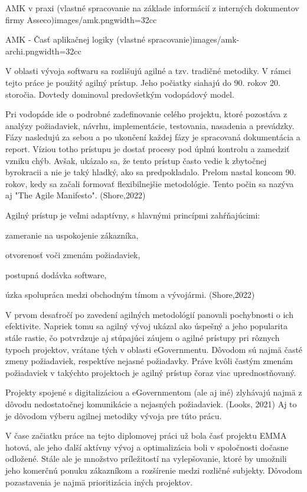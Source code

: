 {AMK v praxi (vlastné spracovanie na základe informácií z interných dokumentov firmy Asseco)}{images/amk.png}{width=32cc}

{AMK - Časť aplikačnej logiky (vlastné spracovanie)}{images/amk-archi.png}{width=32cc}

V oblasti vývoja softwaru sa rozlišujú agilné a tzv. tradičné metodiky. V rámci tejto práce je použitý agilný prístup. Jeho počiatky siahajú do 90. rokov 20. storočia. Dovtedy dominoval predovšetkým vodopádový model.

Pri vodopáde ide o podrobné zadefinovanie celého projektu, ktoré pozostáva z analýzy požiadaviek, návrhu, implementácie, testovania, nasadenia a prevádzky. Fázy nasledujú za sebou a po ukončení každej fázy je spracovaná dokumentácia a report. Víziou totho prístupu je dostať procesy pod úplnú kontrolu a zamedziť vzniku chýb. Avšak, ukázalo sa, že tento prístup často vedie k zbytočnej byrokracii a nie je taký hladký, ako sa predpokladalo. Prelom nastal koncom 90. rokov, kedy sa začali formovať flexibilnejšie metodológie. Tento počin sa nazýva aj "The Agile Manifesto". \scr(Shore,2022)

Agilný prístup je veľmi adaptívny, s hlavnými princípmi zahŕňajúcimi:

\startitemize
\item zameranie na uspokojenie zákazníka, 
\item otvorenosť voči zmenám požiadaviek,
\item postupná dodávka software,
\item úzka spolupráca medzi obchodným tímom a vývojármi. \scr(Shore,2022) 
\stopitemize

V prvom desaťročí po zavedení agilných metodológií panovali pochybnosti o ich efektivite. Napriek tomu sa agilný vývoj ukázal ako úspešný a jeho popularita stále rastie, čo potvrdzuje aj stúpajúci záujem o agilné prístupy pri rôznych typoch projektov, vrátane tých v oblasti eGovernmentu. Dôvodom sú najmä časté zmeny požiadaviek, respektíve nejasné požiadavky. Práve kvôli častým zmenám požiadaviek v takýchto projektoch je agilný prístup čoraz viac uprednostňovaný.

Projekty spojené s digitalizáciou a eGovernmentom (ale aj iné) zlyhávajú najmä z dôvodu nedostatočnej komunikácie a nejasných požiadaviek. \scr(Looks, 2021) Aj to je dôvodom výberu agilnej metodiky vývoja pre túto prácu.

V čase začiatku práce na tejto diplomovej práci už bola časť projektu EMMA hotová, ale  jeho ďalší aktívny vývoj a optimalizácia boli v spoločnosti dočasne odložené. Stále ale je množstvo príležitostí na vylepšovanie, ktoré by umožnili jeho komerčnú ponuku zákazníkom a rozšírenie medzi rozličné subjekty. Dôvodom pozastavenia je najmä prioritizácia iných projektov.

